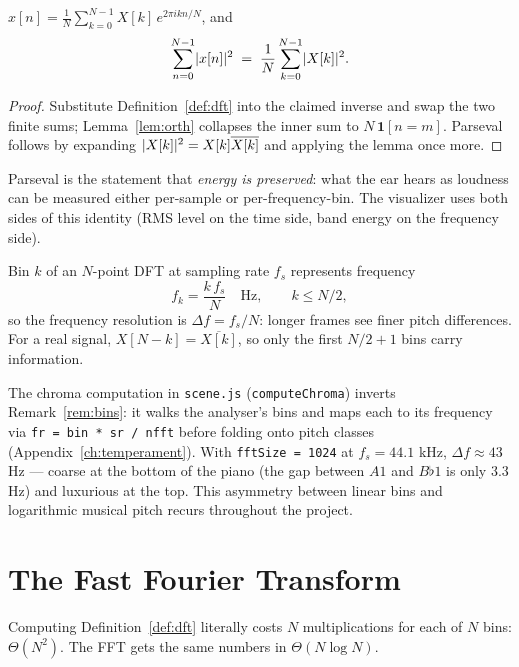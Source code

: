 \begin{corollary}\label{cor:parseval}
$x[n] = \frac{1}{N}\sum_{k=0}^{N-1} X[k]\, e^{2\pi i k n/N}$, and
\[
\sum_{n=0}^{N-1} \lvert x[n]\rvert^2 \;=\; \frac{1}{N} \sum_{k=0}^{N-1}
\lvert X[k]\rvert^2 .
\]
\end{corollary}

\begin{proof}
Substitute Definition~\ref{def:dft} into the claimed inverse and swap the two
finite sums; Lemma~\ref{lem:orth} collapses the inner sum to $N\,
\mathbf{1}[n = m]$. Parseval follows by expanding
$\lvert X[k]\rvert^2 = X[k]\overline{X[k]}$ and applying the lemma once more.
\end{proof}

Parseval is the statement that \emph{energy is preserved}: what the ear hears
as loudness can be measured either per-sample or per-frequency-bin. The
visualizer uses both sides of this identity (RMS level on the time side, band
energy on the frequency side).

\begin{remark}\label{rem:bins}
Bin $k$ of an $N$-point DFT at sampling rate $f_s$ represents frequency
\[
f_k = \frac{k \, f_s}{N} \quad \text{Hz}, \qquad k \le N/2,
\]
so the frequency resolution is $\Delta f = f_s / N$: longer frames see finer
pitch differences. For a real signal, $X[N-k] = \overline{X[k]}$, so only the
first $N/2 + 1$ bins carry information.
\end{remark}

\begin{incode}
The chroma computation in \texttt{scene.js}
(\texttt{computeChroma}) inverts Remark~\ref{rem:bins}: it walks the
analyser's bins and maps each to its frequency via
\texttt{fr = bin * sr / nfft} before folding onto pitch classes
(Appendix~\ref{ch:temperament}). With \texttt{fftSize = 1024} at
$f_s = 44.1$ kHz, $\Delta f \approx 43$ Hz --- coarse at the bottom of the
piano (the gap between $A1$ and $B\flat1$ is only $3.3$ Hz) and luxurious at
the top. This asymmetry between linear bins and logarithmic musical pitch
recurs throughout the project.
\end{incode}

\section{The Fast Fourier Transform}

Computing Definition~\ref{def:dft} literally costs $N$ multiplications for
each of $N$ bins: $\Theta(N^2)$. The FFT gets the same numbers in
$\Theta(N \log N)$.

